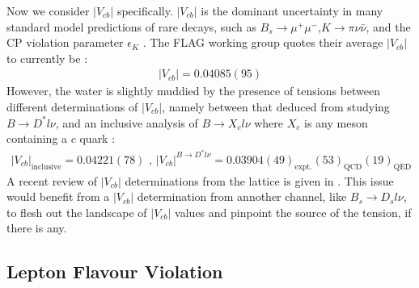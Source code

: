 Now we consider $|V_{cb}|$ specifically. $|V_{cb}|$ is the dominant uncertainty in many standard model predictions of rare decays, such as $B_s \to \mu^+\mu^-$,$K\to\pi\nu\bar{\nu}$, and the CP violation parameter $\epsilon_K$ \cite{Na:2015kha}. The FLAG working group quotes their average $|V_{cb}|$ to currently be \cite{Aoki:2016frl}:
\begin{align}
	|V_{cb}| = 0.04085(95)
\end{align}
However, the water is slightly muddied by the presence of tensions between different determinations of $|V_{cb}|$, namely between that deduced from studying $B\to D^*l\nu$, and an inclusive analysis of $B\to X_c l\nu$ where $X_c$ is any meson containing a $c$ quark \cite{Na:2015kha}:
\begin{align}
	|V_{cb}|_{\text{inclusive}} = 0.04221(78) \text{ , } |V_{cb}|^{B\to D^* l\nu} = 0.03904(49)_{\text{expt.}}(53)_{\text{QCD}}(19)_{\text{QED}}
\end{align}
A recent review of $|V_{cb}|$ determinations from the lattice is given in \cite{Wingate:2017unz}. This issue would benefit from a $|V_{cb}|$ determination from annother channel, like $B_s\to D_s l\nu$, to flesh out the landscape of $|V_{cb}|$ values and pinpoint the source of the tension, if there is any.

\subsection{Lepton Flavour Violation}
\label{sec:anomalies}

